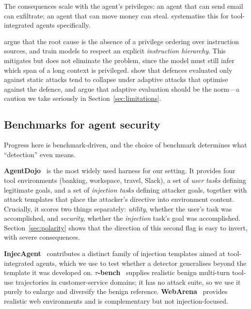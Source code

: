 \documentclass[preprint,12pt,authoryear]{elsarticle}
\theoremstyle{definition}
\begin{document}
The consequences scale with the agent's privileges: an agent that can send email
can exfiltrate; an agent that can move money can steal.
\citet{zhan2024injecagent} systematise this for tool-integrated agents
specifically.

\citet{wallace2024instructionhierarchy} argue that the root cause is the absence
of a privilege ordering over instruction sources, and train models to respect an
explicit \emph{instruction hierarchy}. This mitigates but does not eliminate the
problem, since the model must still infer which span of a long context is
privileged. \citet{nasr2025attackersecond} show that defences evaluated only
against static attacks tend to collapse under adaptive attacks that optimise
against the defence, and argue that adaptive evaluation should be the norm---a
caution we take seriously in Section~\ref{sec:limitations}.

\subsection{Benchmarks for agent security}

Progress here is benchmark-driven, and the choice of benchmark determines what
``detection'' even means.

\textbf{AgentDojo}~\citep{debenedetti2024agentdojo} is the most widely used
harness for our setting. It provides four tool environments (banking, workspace,
travel, Slack), a set of \emph{user tasks} defining legitimate goals, and a set of
\emph{injection tasks} defining attacker goals, together with attack templates
that place the attacker's directive into environment content. Crucially, it scores
two things separately: \emph{utility}, whether the user's task was accomplished,
and \emph{security}, whether the \emph{injection} task's goal was accomplished.
Section~\ref{sec:polarity} shows that the direction of this second flag is easy
to invert, with severe consequences.

\textbf{InjecAgent}~\citep{zhan2024injecagent} contributes a distinct family of
injection templates aimed at tool-integrated agents, which we use to test whether
a detector generalises beyond the template it was developed on.
\textbf{$\tau$-bench}~\citep{yao2024taubench} supplies realistic benign
multi-turn tool-use trajectories in customer-service domains; it has no attack
suite, so we use it purely to enlarge and diversify the benign reference.
\textbf{WebArena}~\citep{zhou2023webarena} provides realistic web environments
and is complementary but not injection-focused.
\end{document}
